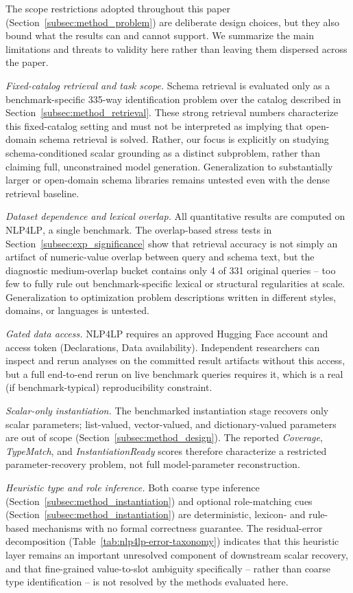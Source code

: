 \documentclass[pdflatex,sn-basic,Numbered]{sn-jnl}
\begin{document}
The scope restrictions adopted throughout this paper (Section~\ref{subsec:method_problem}) are deliberate design choices, but they also bound what the results can and cannot support. We summarize the main limitations and threats to validity here rather than leaving them dispersed across the paper.

\emph{Fixed-catalog retrieval and task scope.} Schema retrieval is evaluated only as a benchmark-specific 335-way identification problem over the catalog described in Section~\ref{subsec:method_retrieval}. These strong retrieval numbers characterize this fixed-catalog setting and must not be interpreted as implying that open-domain schema retrieval is solved. Rather, our focus is explicitly on studying schema-conditioned scalar grounding as a distinct subproblem, rather than claiming full, unconstrained model generation. Generalization to substantially larger or open-domain schema libraries remains untested even with the dense retrieval baseline.

\emph{Dataset dependence and lexical overlap.} All quantitative results are computed on \textsc{NLP4LP}, a single benchmark. The overlap-based stress tests in Section~\ref{subsec:exp_significance} show that retrieval accuracy is not simply an artifact of numeric-value overlap between query and schema text, but the diagnostic medium-overlap bucket contains only 4 of 331 original queries -- too few to fully rule out benchmark-specific lexical or structural regularities at scale. Generalization to optimization problem descriptions written in different styles, domains, or languages is untested.

\emph{Gated data access.} \textsc{NLP4LP} requires an approved Hugging Face account and access token (Declarations, Data availability). Independent researchers can inspect and rerun analyses on the committed result artifacts without this access, but a full end-to-end rerun on live benchmark queries requires it, which is a real (if benchmark-typical) reproducibility constraint.

\emph{Scalar-only instantiation.} The benchmarked instantiation stage recovers only scalar parameters; list-valued, vector-valued, and dictionary-valued parameters are out of scope (Section~\ref{subsec:method_design}). The reported \textit{Coverage}, \textit{TypeMatch}, and \textit{InstantiationReady} scores therefore characterize a restricted parameter-recovery problem, not full model-parameter reconstruction.

\emph{Heuristic type and role inference.} Both coarse type inference (Section~\ref{subsec:method_instantiation}) and optional role-matching cues (Section~\ref{subsec:method_instantiation}) are deterministic, lexicon- and rule-based mechanisms with no formal correctness guarantee. The residual-error decomposition (Table~\ref{tab:nlp4lp-error-taxonomy}) indicates that this heuristic layer remains an important unresolved component of downstream scalar recovery, and that fine-grained value-to-slot ambiguity specifically -- rather than coarse type identification -- is not resolved by the methods evaluated here.
\end{document}
